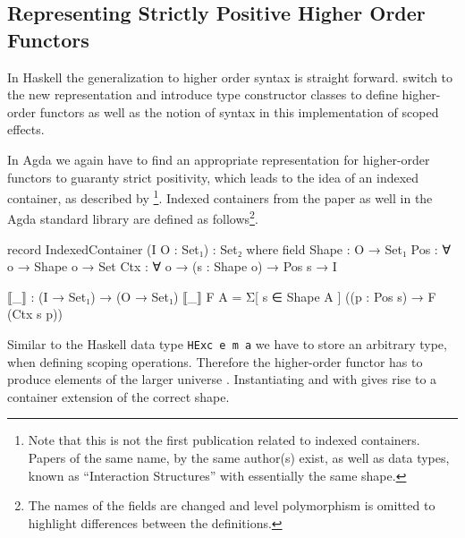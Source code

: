 \subsection{Representing Strictly Positive Higher Order Functors}
\label{higher-order:container}

In Haskell the generalization to higher order syntax is straight forward.
\textcite{DBLP:conf/haskell/WuSH14} switch to the new representation and
introduce type constructor classes to define higher-order functors as well as
the notion of syntax in this implementation of scoped effects.

In Agda we again have to find an appropriate representation for higher-order
functors to guaranty strict positivity, which leads to the idea of an indexed
container, as described by \textcite{DBLP:journals/jfp/AltenkirchGHMM15}
\footnote{Note that this is not the first publication related to indexed
  containers. Papers of the same name, by the same author(s) exist, as well as
  data types, known as ``Interaction Structures'' with essentially the same
  shape.}. 
Indexed containers from the paper as well in the Agda standard library are
defined as follows\footnote{The names of the fields are changed and level
  polymorphism is omitted to highlight differences between the definitions.}.

\begin{code}
record IndexedContainer (I O : Set₁) : Set₂ where
  field
    Shape : O → Set₁
    Pos : ∀ {o} → Shape o → Set
    Ctx : ∀ {o} → (s : Shape o) → Pos s → I

  ⟦_⟧ : (I → Set₁) → (O → Set₁)
  ⟦_⟧ F A = Σ[ s ∈ Shape A ] ((p : Pos s) → F (Ctx s p))
\end{code}
Similar to the Haskell data type \texttt{HExc e m a} we
have to store an arbitrary type, when defining scoping operations.
Therefore the higher-order functor has to produce elements of the larger
universe .
Instantiating  and  with 
gives rise to a container extension of the correct shape.

